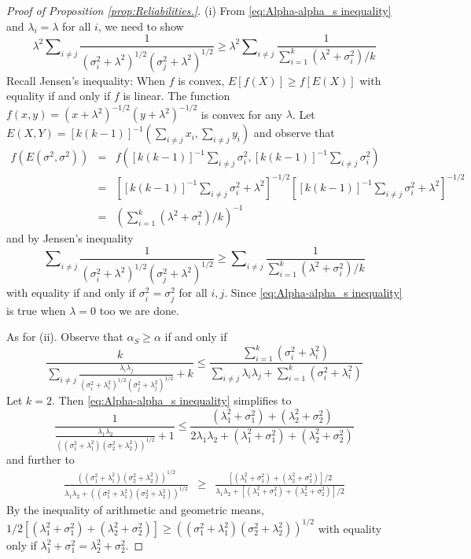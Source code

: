 \documentclass[twoside]{article}
\DeclareMathOperator{\tsum}{\textstyle \sum}
\renewcommand{\sqrt}[1]{{(#1)^{1/2}}}
\begin{document}
\begin{proof}[Proof of Proposition \ref{prop:Reliabilities.}]\label{proof:Reliabilities.}
(i) From \eqref{eq:Alpha-alpha_s inequality} and $\lambda_{i}=\lambda$
for all $i$, we need to show
\[
\lambda^{2}\tsum_{i\neq j}\frac{1}{\sqrt{\sigma_{i}^{2}+\lambda^{2}}\sqrt{\sigma_{j}^{2}+\lambda^{2}}}\geq\lambda^{2}\tsum_{i\neq j}\frac{1}{\tsum_{i=1}^{k}(\lambda^{2}+\sigma_{i}^{2})/k}
\]
Recall Jensen's inequality: When $f$ is convex, $E[f(X)]\geq f[E(X)]$ with equality if and only if $f$ is linear.
The function $f(x,y)=(x+\lambda^{2})^{-1/2}(y+\lambda^{2})^{-1/2}$
is convex for any $\lambda$. Let $E(X,Y)=[k(k-1)]^{-1}(\tsum_{i\neq j}x_{i},\tsum_{i\neq j}y_{i})$
and observe that
\begin{eqnarray*}
f(E(\sigma^{2},\sigma^{2})) & = & f([k(k-1)]^{-1}\tsum_{i\neq j}\sigma_{i}^{2},[k(k-1)]^{-1}\tsum_{i\neq j}\sigma_{i}^{2})\\
 & = & [[k(k-1)]^{-1}\tsum_{i\neq j}\sigma_{i}^{2}+\lambda^{2}]^{-1/2}[[k(k-1)]^{-1}\tsum_{i\neq j}\sigma_{i}^{2}+\lambda^{2}]^{-1/2}\\
 & = & (\tsum_{i=1}^{k}(\lambda^{2}+\sigma_{i}^{2})/k)^{-1}
\end{eqnarray*}
and by Jensen's inequality
\[
\tsum_{i\neq j}\frac{1}{\sqrt{\sigma_{i}^{2}+\lambda^{2}}\sqrt{\sigma_{j}^{2}+\lambda^{2}}}\geq\tsum_{i\neq j}\frac{1}{\tsum_{i=1}^{k}(\lambda^{2}+\sigma_{i}^{2})/k}
\]
with equality if and only if $\sigma_{i}^{2}=\sigma_{j}^{2}$ for
all $i,j$. Since \eqref{eq:Alpha-alpha_s inequality} is true when
$\lambda=0$ too we are done.

As for (ii). Observe that $\alpha_S\geq\alpha$
if and only if
\begin{equation}
\label{eq:Alpha-alpha_s inequality}
\frac{k}{\tsum_{i\neq j}\frac{\lambda_{i}\lambda_{j}}{\sqrt{\sigma_{i}^{2}+\lambda_{i}^{2}}\sqrt{\sigma_{j}^{2}+\lambda_{j}^{2}}}+k}\leq\frac{\tsum_{i=1}^{k}(\sigma_{i}^{2}+\lambda_{i}^{2})}{\tsum_{i\neq j}\lambda_{i}\lambda_{j}+\tsum_{i=1}^{k}(\sigma_{i}^{2}+\lambda_{i}^{2})}
\end{equation}
Let $k=2$. Then \eqref{eq:Alpha-alpha_s inequality} simplifies to
\[
\frac{1}{\frac{\lambda_{1}\lambda_{2}}{\sqrt{(\sigma_{1}^{2}+\lambda_{1}^{2})(\sigma_{2}^{2}+\lambda_{2}^{2})}}+1}\leq\frac{(\lambda_{1}^{2}+\sigma_{1}^{2})+(\lambda_{2}^{2}+\sigma_{2}^{2})}{2\lambda_{1}\lambda_{2}+(\lambda_{1}^{2}+\sigma_{1}^{2})+(\lambda_{2}^{2}+\sigma_{2}^{2})}
\]
and further to
\begin{eqnarray*}
\frac{\sqrt{(\sigma_{1}^{2}+\lambda_{1}^{2})(\sigma_{2}^{2}+\lambda_{2}^{2})}}{\lambda_{1}\lambda_{2}+\sqrt{(\sigma_{1}^{2}+\lambda_{1}^{2})(\sigma_{2}^{2}+\lambda_{2}^{2})}} & \geq & \frac{[(\lambda_{1}^{2}+\sigma_{1}^{2})+(\lambda_{2}^{2}+\sigma_{2}^{2})]/2}{\lambda_{1}\lambda_{2}+[(\lambda_{1}^{2}+\sigma_{1}^{2})+(\lambda_{2}^{2}+\sigma_{2}^{2})]/2}
\end{eqnarray*}
By the inequality of arithmetic and geometric means, $1/2[(\lambda_{1}^{2}+\sigma_{1}^{2})+(\lambda_{2}^{2}+\sigma_{2}^{2})]\geq\sqrt{(\sigma_{1}^{2}+\lambda_{1}^{2})(\sigma_{2}^{2}+\lambda_{2}^{2})}$
with equality only if $\lambda_{1}^{2}+\sigma_{1}^{2}=\lambda_{2}^{2}+\sigma_{2}^{2}$.


\end{proof}
\end{document}
